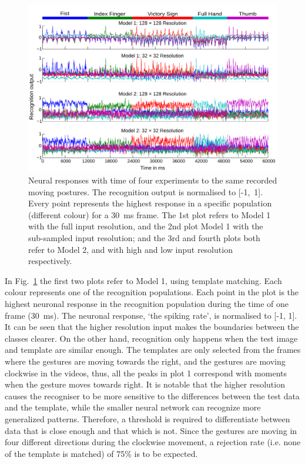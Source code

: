 \begin{figure}
\centering
	\includegraphics[width=\textwidth]{pics_icann/rateMatlab.pdf}
	\caption{Neural responses with time of four experiments to the same recorded moving postures.
	The recognition output is normalised to \mbox{[-1, 1]}.
	Every point represents the highest response in a specific population (different colour) for a 30~ms frame.
	The 1st plot refers to Model 1 with the full input resolution, and the 2nd plot Model 1 with the sub-sampled input resolution; and the 3rd and fourth plots both refer to Model 2, and with high and low input resolution respectively. 
	}
	\label{fig:matlabrec}
\end{figure}




In Fig.~\ref{fig:matlabrec} the first two plots refer to Model 1, using template matching. Each colour represents one of the recognition populations. 
Each point in the plot is the highest neuronal response in the recognition population during the time of one frame (30~ms). 
The neuronal response, `the spiking rate', is normalised to [-1, 1]. 
It can be seen that the higher resolution input makes the boundaries between the classes clearer. 
On the other hand, recognition only happens when the test image and template are similar enough. 
The templates are only selected from the frames where the gestures are moving towards the right, and the gestures are moving clockwise in the videos, thus, all the peaks in plot 1 correspond with moments when the gesture moves towards right.  
It is notable that the higher resolution causes the recogniser to be more sensitive to the differences between the test data and the template, while the smaller neural network can recognize more generalized patterns. 
Therefore, a threshold is required to differentiate between data that is close enough and that which is not. 
Since the gestures are moving in four different directions during the clockwise movement, a rejection rate (i.e. none of the template is matched) of 75\% is to be expected. 

